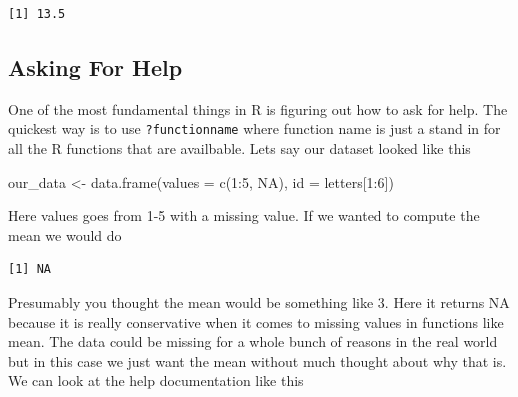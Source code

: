 \documentclass[
  letterpaper,
  DIV=11,
  numbers=noendperiod,
  oneside]{scrreprt}
\newenvironment{Shaded}{\begin{snugshade}}{\end{snugshade}}
\newcommand{\AttributeTok}[1]{\textcolor[rgb]{0.40,0.45,0.13}{#1}}
\newcommand{\ConstantTok}[1]{\textcolor[rgb]{0.56,0.35,0.01}{#1}}
\newcommand{\DecValTok}[1]{\textcolor[rgb]{0.68,0.00,0.00}{#1}}
\newcommand{\FunctionTok}[1]{\textcolor[rgb]{0.28,0.35,0.67}{#1}}
\newcommand{\NormalTok}[1]{\textcolor[rgb]{0.00,0.23,0.31}{#1}}
\newcommand{\OtherTok}[1]{\textcolor[rgb]{0.00,0.23,0.31}{#1}}
\newcommand{\SpecialCharTok}[1]{\textcolor[rgb]{0.37,0.37,0.37}{#1}}
\begin{document}
\begin{Shaded}
\end{Shaded}

\begin{verbatim}
[1] 13.5
\end{verbatim}

\hypertarget{asking-for-help}{%
\subsection{Asking For Help}\label{asking-for-help}}

One of the most fundamental things in R is figuring out how to ask for
help. The quickest way is to use \texttt{?functionname} where function
name is just a stand in for all the R functions that are availbable.
Lets say our dataset looked like this

\begin{Shaded}
\begin{Highlighting}[]
\NormalTok{our\_data }\OtherTok{\textless{}{-}} \FunctionTok{data.frame}\NormalTok{(}\AttributeTok{values =} \FunctionTok{c}\NormalTok{(}\DecValTok{1}\SpecialCharTok{:}\DecValTok{5}\NormalTok{, }\ConstantTok{NA}\NormalTok{),}
                       \AttributeTok{id =}\NormalTok{ letters[}\DecValTok{1}\SpecialCharTok{:}\DecValTok{6}\NormalTok{])}
\end{Highlighting}
\end{Shaded}

Here values goes from 1-5 with a missing value. If we wanted to compute
the mean we would do

\begin{Shaded}
\end{Shaded}

\begin{verbatim}
[1] NA
\end{verbatim}

Presumably you thought the mean would be something like 3. Here it
returns NA because it is really conservative when it comes to missing
values in functions like mean. The data could be missing for a whole
bunch of reasons in the real world but in this case we just want the
mean without much thought about why that is. We can look at the help
documentation like this
\end{document}

